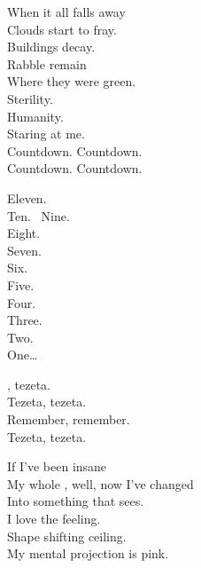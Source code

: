 When it all falls away \\
Clouds start to fray. \\
Buildings decay. \\
Rabble remain \\
Where they were green. \\
Sterility. \\
Humanity. \\
Staring at me. \\

Countdown. Countdown. \\
Countdown. Countdown. \\





Eleven. \\
Ten. \
Nine. \\
Eight. \\
Seven. \\
Six. \\
Five. \\
Four. \\
Three. \\
Two. \\
One… \\





, tezeta. \\
Tezeta, tezeta. \\
Remember, remember. \\
Tezeta, tezeta. \\


If I've been insane \\
My whole , well, now I've changed \\
Into something that sees. \\
I love the feeling. \\
Shape shifting ceiling. \\
My mental projection is pink. \\

